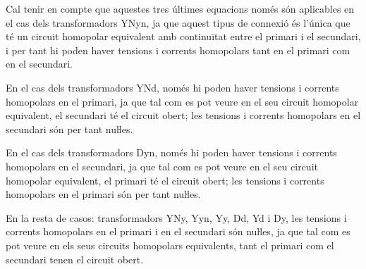 Cal tenir en compte que aquestes tres últimes equacions  només són aplicables en el cas dels transformadors YNyn, ja que aquest tipus de connexió és l'única que té un circuit homopolar equivalent amb continuïtat entre el primari i el secundari, i per tant hi poden haver tensions i corrents homopolars tant en el primari com en el secundari.

En el cas dels transformadors YNd, només hi poden haver tensions i corrents homopolars en el primari, ja que tal com es pot veure en el seu circuit homopolar equivalent, el secundari té el circuit obert; les tensions i corrents homopolars en el secundari són per tant nuŀles.


En el cas dels transformadors Dyn, només hi poden haver tensions i corrents homopolars en el secundari, ja que tal com es pot veure en el seu circuit homopolar equivalent, el primari té el circuit obert; les tensions i corrents homopolars en el primari són per tant nuŀles.

En la resta de casos: transformadors YNy, Yyn, Yy, Dd, Yd i Dy, les tensions i corrents homopolars en el primari i en el secundari són  nuŀles, ja que tal com es pot veure en els seus circuits homopolars equivalents, tant el primari com el secundari tenen el circuit obert.


